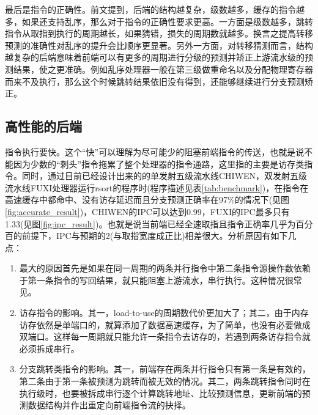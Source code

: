 	最后是指令的正确性。前文提到，后端的结构越复杂，级数越多，缓存的指令越多，如果还支持乱序，那么对于指令的正确性要求更高。一方面是级数越多，跳转指令从取指到执行的周期越长，如果猜错，损失的周期数就越多。换言之提高转移预测的准确性对乱序的提升会比顺序更显著。另外一方面，对转移猜测而言，结构越复杂的后端意味着前端可以有更多的周期进行分级的预测并矫正上游流水级的预测结果，使之更准确。例如乱序处理器一般在第三级做重命名以及分配物理寄存器而来不及执行，那么这个时候跳转结果依旧没有得到，还能够继续进行分支预测矫正。
	
	\subsection{高性能的后端}
	
	指令执行要快。这个``快''可以理解为尽可能少的阻塞前端指令的传送，也就是说不能因为少数的``刺头''指令拖累了整个处理器的指令通路，这里指的主要是访存类指令。同时，通过目前已经设计出来的的单发射五级流水线CHIWEN，双发射五级流水线FUXI处理器运行rsort的程序时(程序描述见表\ref{tab:benchmark})，在指令在高速缓存中都命中、没有访存延迟而且分支预测正确率在97\%的情况下(见图\ref{fig:accurate_result})，CHIWEN的IPC可以达到0.99，FUXI的IPC最多只有1.33(见图\ref{fig:ipc_result})。也就是说当前端已经全速取指且指令正确率几乎为百分百的前提下，IPC与预期的2(与取指宽度成正比)相差很大。分析原因有如下几点：
	\begin{enumerate}[label=(\alph*)]
		\item 最大的原因首先是如果在同一周期的两条并行指令中第二条指令源操作数依赖于第一条指令的写回结果，就只能阻塞上游流水，串行执行。这种情况很常见。
		\item 访存指令的影响。其一，load-to-use的周期数代价更加大了；其二，由于内存访存依然是单端口的，就算添加了数据高速缓存，为了简单，也没有必要做成双端口。这样每一周期就只能允许一条指令去访存的，若遇到两条访存指令就必须拆成串行。
		\item 分支跳转类指令的影响。其一，前端存在两条并行指令只有第一条是有效的，第二条由于第一条被预测为跳转而被无效的情况。其二，两条跳转指令同时在执行级时，也要被拆成串行逐个计算跳转地址、比较预测信息，更新前端的预测数据结构并作出重定向前端指令流的抉择。
	\end{enumerate}

